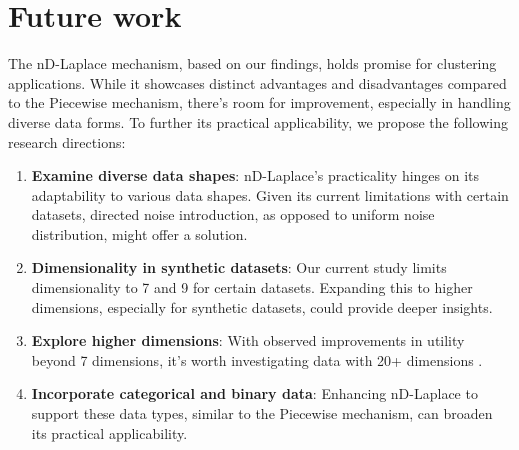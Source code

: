 \section{Future work}
The nD-Laplace mechanism, based on our findings, holds promise for clustering applications. While it showcases distinct advantages and disadvantages compared to the Piecewise mechanism, there's room for improvement, especially in handling diverse data forms. To further its practical applicability, we propose the following research directions:

\begin{enumerate}
\item \textbf{Examine diverse data shapes}: nD-Laplace's practicality hinges on its adaptability to various data shapes. Given its current limitations with certain datasets, directed noise introduction, as opposed to uniform noise distribution, might offer a solution.
\item \textbf{Dimensionality in synthetic datasets}: Our current study limits dimensionality to 7 and 9 for certain datasets. Expanding this to higher dimensions, especially for synthetic datasets, could provide deeper insights.
\item \textbf{Explore higher dimensions}: With observed improvements in utility beyond 7 dimensions, it's worth investigating data with 20+ dimensions .
\item \textbf{Incorporate categorical and binary data}: Enhancing nD-Laplace to support these data types, similar to the Piecewise mechanism, can broaden its practical applicability. 
\end{enumerate}

